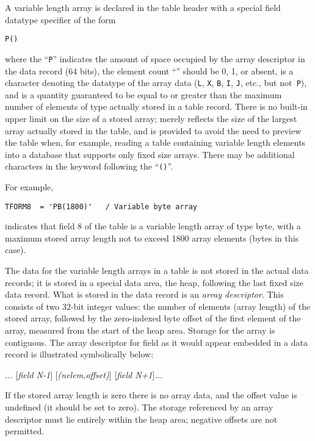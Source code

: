 A variable length array is declared in the table header with a special
field datatype specifier of the form\\
\centerline{\verb|P|\verb|(|\verb|)|}
where the ``\verb|P|'' indicates the amount of space occupied by the
array descriptor in the data record (64 bits), the element count
``'' should be 0, 1, or absent,  is a character denoting
the datatype of the array data (\verb|L|, \verb|X|, \verb|B|,
\verb|I|, \verb|J|, etc., but not\verb| P|), and  is a
quantity guaranteed to be equal to or greater than the maximum number
of elements of type  actually stored in a table record. There
is no built-in upper limit on the size of a stored array;
 merely reflects the size of the largest array actually
stored in the table, and is provided to avoid the need to preview the
table when, for example, reading a table containing variable length
elements into a database that supports only fixed size arrays.  There
may be additional characters in the  keyword
following the ``\verb|(|\verb|)|''.

For example,\\
\centerline{\verb|TFORM8  = 'PB(1800)'   / Variable byte array|}
indicates that field 8 of the table is a variable length array of type
byte, with a maximum stored array length not to exceed 1800 array
elements (bytes in this case).

The data for the variable length arrays in a table is not stored in
the actual data records; it is stored in a special data area, the
heap, following the last fixed size data record.  What is stored in
the data record is an {\it array descriptor}.  This consists of two
32-bit integer values: the number of elements (array length) of the
stored array, followed by the zero-indexed byte offset of the first
element of the array, measured from the start of the heap area.
Storage for the array is contiguous.  The array descriptor for field
 as it would appear embedded in a data record is illustrated
symbolically below:\\
\centerline{{\em ... }[{\em field N-1}] [{\em (nelem,offset)}] 
    [{\em field N+1}]{\em ...}}
If the stored array length is zero there is no array data, and the
offset value is undefined (it should be set to zero).  The storage
referenced by an array descriptor must lie entirely within the heap
area; negative offsets are not permitted.

